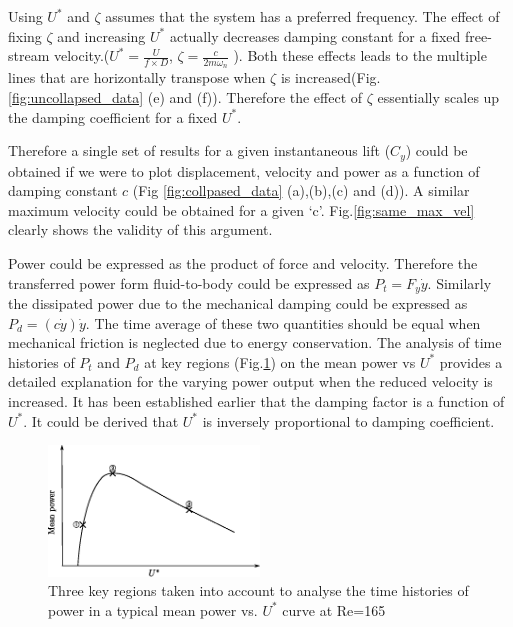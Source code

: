  Using $U^*$ and $\zeta$ assumes that the system has a preferred frequency. The effect of fixing $\zeta$ and increasing $U^*$ actually decreases damping constant for a fixed free-stream velocity.($U^*=\frac{U}{f \times D}$, $\zeta= \frac{c}{2 m \omega_n}$ ). Both these effects leads to the multiple lines that are horizontally transpose when $\zeta$ is increased(Fig.\ref{fig:uncollapsed_data} (e) and (f)). Therefore the effect of $\zeta$ essentially scales up the damping coefficient for a fixed $U^*$. 
 \vspace{1cm}
 
 Therefore a single set of results for a given instantaneous lift ($C_y$) could be obtained if we were to plot displacement, velocity and power as a function of damping constant $c$ (Fig \ref{fig:collpased_data} (a),(b),(c) and (d)). A similar maximum velocity could be obtained for a given `c'. Fig.\ref{fig:same_max_vel} clearly shows the validity of this argument. 
 


 



 
 Power could be expressed as the product of force and velocity. Therefore the transferred power form fluid-to-body could be expressed as $P_t=F_y\dot{y}$. Similarly the dissipated power due to the mechanical damping could be expressed as $P_d=(c\dot{y})\dot{y}$. The time average of these two quantities should be equal when mechanical friction is neglected due to energy conservation. The analysis of time histories of $P_t $ and $P_d$ at key regions (Fig.\ref{fig:regions_1}) on the mean power vs $U^*$ provides a detailed explanation for the varying power output when the reduced velocity is increased. It has been established earlier that the damping factor is a function of $U^*$. It could be derived that $U^*$ is inversely proportional to damping coefficient. 

\begin{figure}[h!]
\centering
\includegraphics[width=0.5\textwidth]{../FnP/sketch_1}
\caption{ Three key regions taken into account to analyse the time histories of power in a typical mean power vs. $U^*$ curve at Re=165 }
\label{fig:regions_1}
\end{figure}


